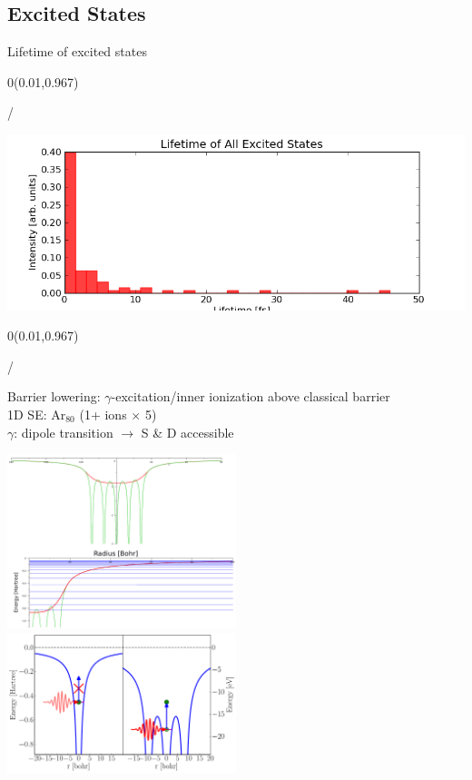 \documentclass{beamer}
\makeatletter
\newcommand{\framenumber}{
\begin{textblock}{0}(0.01,0.967)
\begin{scriptsize}
{\color{gray}\insertframenumber/\inserttotalframenumber}
\end{scriptsize}
\end{textblock}
}
\makeatother
\begin{document}
\subsection{Excited States}
\begin{frame}{Lifetime of excited states}\framenumber
\begin{center}
\includegraphics[width=\textwidth]{figures/appendix/lifetimes}
\end{center}
\end{frame}
\begin{frame}{}\framenumber
Barrier lowering: $\gamma$-excitation/inner ionization above classical barrier\\
1D SE: Ar$_{80}$ (1+ ions $\times$ 5)\\
$\gamma$: dipole transition $\rightarrow$ S \& D accessible
\begin{center}
\includegraphics[width=0.5\textwidth]{figures/appendix/DOS_all}
\includegraphics[width=0.5\textwidth]{../figures/heating_barrier_sup}
\end{center}
\end{frame}
\end{document}
